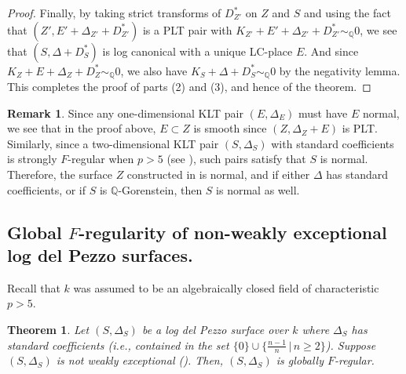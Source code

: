 \documentclass[11pt,reqno]{amsart}
\newcommand{\Q}{\mathbb{Q}}
\numberwithin{equation}{section}
\newtheorem{thm}[prop] {Theorem}
\theoremstyle{definition}
\newtheorem{rem}[prop] {Remark}
\begin{document}
\begin{proof}
    Finally, by taking strict transforms of $D^* _{Z'}$ on $Z$ and $S$ and using the fact that $(Z', E'+ \Delta_{Z'} + D^*_{Z'} ) $ is a PLT pair with $ K_{Z'} + E'+ \Delta_{Z'} + D^* _{Z'} \sim _\Q 0 $, we see that $(S, \Delta + D^*_S)$ is log canonical with a unique LC-place $E$. And since $K_Z + E + \Delta_Z + D^* _Z \sim_ \Q 0$, we also have $K_S + \Delta + D^*_S \sim _\Q 0$ by the negativity lemma. This completes the proof of parts (2) and (3), and hence of the theorem.
\end{proof}


\begin{rem}
    Since any one-dimensional KLT pair $(E, \Delta_E)$ must have $E$ normal, we see that in the proof above, $E \subset Z$ is smooth since $(Z, \Delta_Z + E)$ is PLT. Similarly, since a two-dimensional KLT pair $(S, \Delta_S)$ with standard coefficients is strongly $F$-regular when $p >5$ (see \cite{HaraDimensionTwo}), such pairs satisfy that $S$ is normal. Therefore, the surface $Z$ constructed in  is normal, and if either $\Delta$ has standard coefficients, or if $S$ is $\Q$-Gorenstein, then $S$ is normal as well. 
\end{rem}

\subsection{Global $F$-regularity of non-weakly exceptional log del Pezzo surfaces.}
Recall that $k$ was assumed to be an algebraically closed field of characteristic $p>5$.

\begin{thm} \label{thm:gFrofsurfaces}
    Let $(S, \Delta_S)$ be a log del Pezzo surface over $k$ where $\Delta_S$ has standard coefficients (i.e., contained in the set $\{0\} \cup \{\frac{n-1}{n} \, | \, n \geq 2 \}$). Suppose $(S, \Delta_S)$ is not weakly exceptional (). Then, $(S, \Delta_S)$ is globally $F$-regular.
\end{thm}
\end{document}
